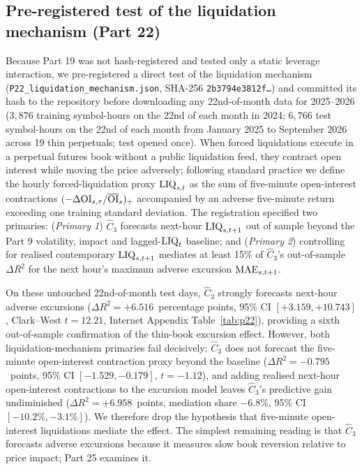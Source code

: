 \documentclass[12pt]{article}
\theoremstyle{definition}
\theoremstyle{remark}
\begin{document}
\subsection{Pre-registered test of the liquidation mechanism (Part 22)}\label{sec:p22}
Because Part 19 was not hash-registered and tested only a static leverage interaction, we pre-registered a direct test of the liquidation mechanism (\texttt{P22\_liquidation\_mechanism.json}, SHA-256 \texttt{2b3794e3812f\ldots}) and committed its hash to the repository before downloading any 22nd-of-month data for 2025--2026 ($3{,}876$ training symbol-hours on the 22nd of each month in 2024; $6{,}766$ test symbol-hours on the 22nd of each month from January 2025 to September 2026 across 19 thin perpetuals; test opened once). When forced liquidations execute in a perpetual futures book without a public liquidation feed, they contract open interest while moving the price adversely; following standard practice we define the hourly forced-liquidation proxy ${\rm LIQ}_{s,t}$ as the sum of five-minute open-interest contractions $(-\Delta{\rm OI}_{s,\tau}/\overline{\rm OI}_s)_+$ accompanied by an adverse five-minute return exceeding one training standard deviation. The registration specified two primaries: (\emph{Primary 1}) $\hat C_3$ forecasts next-hour ${\rm LIQ}_{s,t+1}$ out of sample beyond the Part 9 volatility, impact and lagged-${\rm LIQ}_t$ baseline; and (\emph{Primary 2}) controlling for realised contemporary ${\rm LIQ}_{s,t+1}$ mediates at least 15\% of $\hat C_3$'s out-of-sample $\Delta R^2$ for the next hour's maximum adverse excursion ${\rm MAE}_{s,t+1}$.



On these untouched 22nd-of-month test days, $\hat C_3$ strongly forecasts next-hour adverse excursions ($\Delta R^2=+6.516$~percentage points, 95\% CI $[+3.159,+10.743]$, Clark--West $t=12.21$, Internet Appendix Table~\ref{tab:p22}), providing a sixth out-of-sample confirmation of the thin-book excursion effect. However, both liquidation-mechanism primaries fail decisively: $\hat C_3$ does not forecast the five-minute open-interest contraction proxy beyond the baseline ($\Delta R^2=-0.795$~points, 95\% CI $[-1.529,-0.179]$, $t=-1.12$), and adding realised next-hour open-interest contractions to the excursion model leaves $\hat C_3$'s predictive gain undiminished ($\Delta R^2=+6.958$~points, mediation share $-6.8\%$, 95\% CI $[-10.2\%,-3.1\%]$). We therefore drop the hypothesis that five-minute open-interest liquidations mediate the effect. The simplest remaining reading is that $\hat C_3$ forecasts adverse excursions because it measures slow book reversion relative to price impact; Part 25 examines it.
\end{document}
